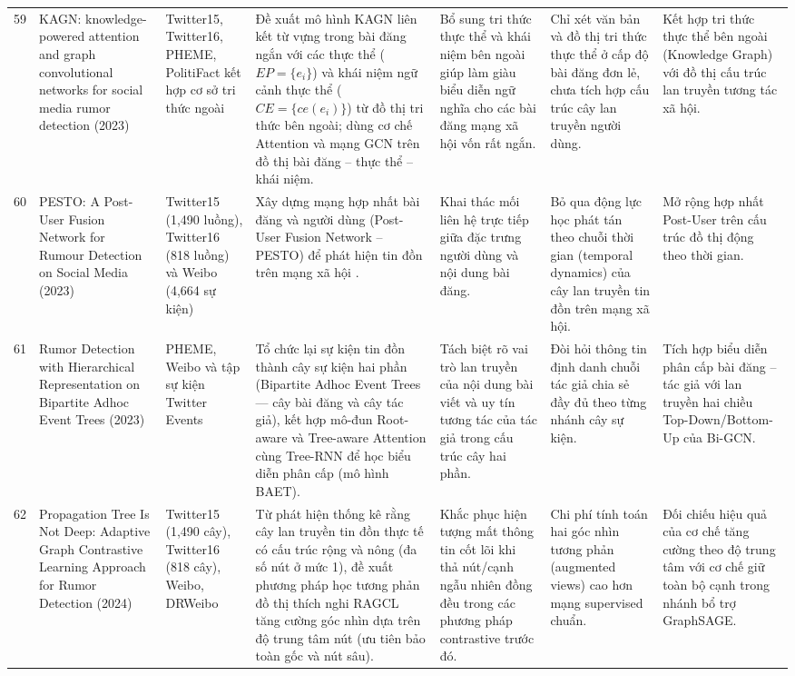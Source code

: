 \documentclass[11pt,a4paper]{extreport}
\begin{document}
\begin{landscape}
\begin{longtable}{@{}C{0.6cm}p{3.6cm}p{2.7cm}p{4.8cm}p{3.6cm}p{3.6cm}p{3.6cm}@{}}
59 & KAGN: knowledge-powered attention and graph convolutional networks for social media rumor detection (2023) \cite{noauthor_kagn_2023} & Twitter15, Twitter16, PHEME, PolitiFact kết hợp cơ sở tri thức ngoài & Đề xuất mô hình KAGN liên kết từ vựng trong bài đăng ngắn với các thực thể ($EP=\{e_i\}$) và khái niệm ngữ cảnh thực thể ($CE=\{ce(e_i)\}$) từ đồ thị tri thức bên ngoài; dùng cơ chế Attention và mạng GCN trên đồ thị bài đăng -- thực thể -- khái niệm. & Bổ sung tri thức thực thể và khái niệm bên ngoài giúp làm giàu biểu diễn ngữ nghĩa cho các bài đăng mạng xã hội vốn rất ngắn. & Chỉ xét văn bản và đồ thị tri thức thực thể ở cấp độ bài đăng đơn lẻ, chưa tích hợp cấu trúc cây lan truyền người dùng. & Kết hợp tri thức thực thể bên ngoài (Knowledge Graph) với đồ thị cấu trúc lan truyền tương tác xã hội. \\ 

60 & PESTO: A Post-User Fusion Network for Rumour Detection on Social Media (2023) \cite{noauthor_pesto_2023} & Twitter15 (1,490 luồng), Twitter16 (818 luồng) và Weibo (4,664 sự kiện) & Xây dựng mạng hợp nhất bài đăng và người dùng (Post-User Fusion Network -- PESTO) để phát hiện tin đồn trên mạng xã hội \cite{noauthor_pesto_2023}. & Khai thác mối liên hệ trực tiếp giữa đặc trưng người dùng và nội dung bài đăng. & Bỏ qua động lực học phát tán theo chuỗi thời gian (temporal dynamics) của cây lan truyền tin đồn trên mạng xã hội. & Mở rộng hợp nhất Post-User trên cấu trúc đồ thị động theo thời gian. \\ 

61 & Rumor Detection with Hierarchical Representation on Bipartite Adhoc Event Trees (2023) \cite{zhang_rumor_2023} & PHEME, Weibo và tập sự kiện Twitter Events & Tổ chức lại sự kiện tin đồn thành cây sự kiện hai phần (Bipartite Adhoc Event Trees --- cây bài đăng và cây tác giả), kết hợp mô-đun Root-aware và Tree-aware Attention cùng Tree-RNN để học biểu diễn phân cấp (mô hình BAET). & Tách biệt rõ vai trò lan truyền của nội dung bài viết và uy tín tương tác của tác giả trong cấu trúc cây hai phần. & Đòi hỏi thông tin định danh chuỗi tác giả chia sẻ đầy đủ theo từng nhánh cây sự kiện. & Tích hợp biểu diễn phân cấp bài đăng -- tác giả với lan truyền hai chiều Top-Down/Bottom-Up của Bi-GCN. \\ 

62 & Propagation Tree Is Not Deep: Adaptive Graph Contrastive Learning Approach for Rumor Detection (2024) \cite{cui_propagation_2024} & Twitter15 (1,490 cây), Twitter16 (818 cây), Weibo, DRWeibo & Từ phát hiện thống kê rằng cây lan truyền tin đồn thực tế có cấu trúc rộng và nông (đa số nút ở mức 1), đề xuất phương pháp học tương phản đồ thị thích nghi RAGCL tăng cường góc nhìn dựa trên độ trung tâm nút (ưu tiên bảo toàn gốc và nút sâu). & Khắc phục hiện tượng mất thông tin cốt lõi khi thả nút/cạnh ngẫu nhiên đồng đều trong các phương pháp contrastive trước đó. & Chi phí tính toán hai góc nhìn tương phản (augmented views) cao hơn mạng supervised chuẩn. & Đối chiếu hiệu quả của cơ chế tăng cường theo độ trung tâm với cơ chế giữ toàn bộ cạnh trong nhánh bổ trợ GraphSAGE. \\ 


\end{longtable}
\end{landscape}
\end{document}
